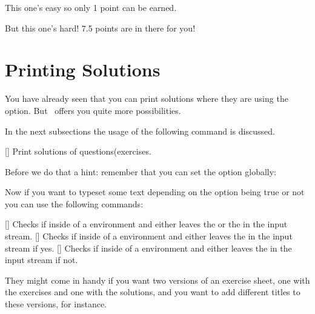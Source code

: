 \documentclass[load-preamble+,scrartcl={DIV10}]{cnltx-doc}
\begin{document}
\begin{example}
  \begin{question}{1}
    This one's easy so only 1 point can be earned.
  \end{question}
  \begin{question}{7.5}
    But this one's hard! 7.5 points are in there for you!
  \end{question}
\end{example}

\section{Printing Solutions}\label{sec:solutions}
You have already seen that you can print solutions where they are using the
 option.  But \ExSheets\ offers you quite more
possibilities.

In the next subsections the usage of the following command is discussed.
\begin{commands}
  []
    Print solutions of questions(exercises.
\end{commands}

Before we do that a hint: remember that you can set the option 
globally:
\begin{sourcecode}
\end{sourcecode}

Now if you want to typeset some text depending on the option being true or not
you can use the following commands:
\begin{commands}
  \expandable{}[]
    Checks if inside of a  environment and either leaves the
     or the  in the input stream.
  \expandable{}[]
    Checks if inside of a  environment and either leaves the
     in the input stream if yes.
  \expandable{}[]
    Checks if inside of a  environment and either leaves the
     in the input stream if not.
\end{commands}
They might come in handy if you want two versions of an exercise sheet, one
with the exercises and one with the solutions, and you want to add different
titles to these versions, for instance.
\end{document}
